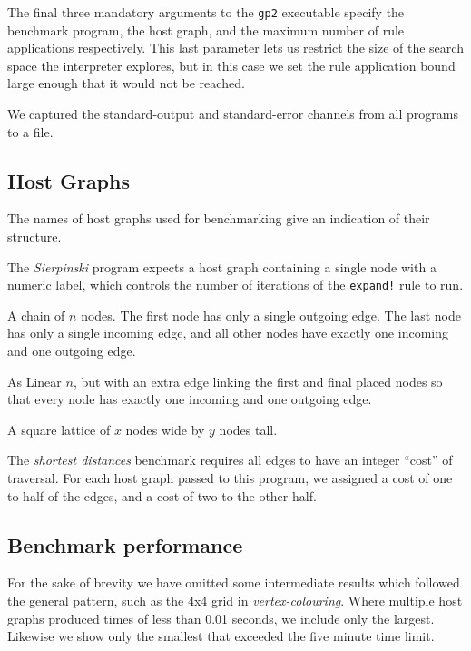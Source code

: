 The final three mandatory arguments to the \texttt{gp2} executable specify the benchmark program, the host graph, and the maximum number of rule applications respectively. This last parameter lets us restrict the size of the search space the interpreter explores, but in this case we set the rule application bound large enough that it would not be reached.

We captured the standard-output and standard-error channels from all programs to a file.

\subsection{Host Graphs}
\label{subsec:hosts}

The names of host graphs used for benchmarking give an indication of their structure.

\begin{description}
	\setlength\itemsep{-0.2em}
	\item[Gen $n$] The \textit{Sierpinski} program expects a host graph containing a single node with a numeric label, which controls the number of iterations of the \texttt{expand!} rule to run.

	\item[Linear $n$] A chain of $n$ nodes. The first node has only a single outgoing edge. The last node has only a single incoming edge, and all other nodes have exactly one incoming and one outgoing edge.

	\item[Cyclic $n$] As Linear $n$, but with an extra edge linking the first and final placed nodes so that every node has exactly one incoming and one outgoing edge.

	\item[$x \times y$ Grid] A square lattice of $x$ nodes wide by $y$ nodes tall.
\end{description}

The \textit{shortest distances} benchmark requires all edges to have an integer ``cost'' of traversal. For each host graph passed to this program, we assigned a cost of one to half of the edges, and a cost of two to the other half.



\subsection{Benchmark performance}\label{sec:benchperf}

For the sake of brevity we have omitted some intermediate results which followed the general pattern, such as the 4x4 grid in \textit{vertex-colouring}. Where multiple host graphs produced times of less than 0.01 seconds, we include only the largest. Likewise we show only the smallest that exceeded the five minute time limit.



